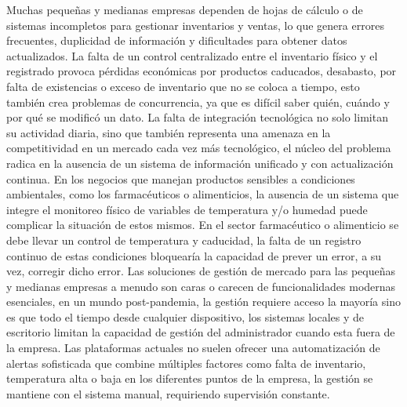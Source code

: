 

Muchas pequeñas y medianas empresas dependen de hojas de cálculo o de sistemas incompletos para gestionar inventarios y ventas, lo que genera errores frecuentes, duplicidad de información y dificultades para obtener datos actualizados. 
La falta de un control centralizado entre el inventario físico y el registrado provoca pérdidas económicas por productos caducados, desabasto, por falta de existencias o exceso de inventario que no se coloca a tiempo, esto también crea problemas de concurrencia, ya que es difícil saber quién, cuándo y por qué se modificó un dato. La falta de integración tecnológica no solo limitan su actividad diaria, sino que también representa una amenaza en la competitividad en un mercado cada vez más tecnológico, el núcleo del problema radica en la ausencia de un sistema de información unificado y con actualización continua.
En los negocios que manejan productos sensibles a condiciones ambientales, como los farmacéuticos o alimenticios, la ausencia de un sistema que integre el monitoreo físico de variables de temperatura y/o humedad puede complicar la situación de estos mismos. En el sector farmacéutico o alimenticio se debe llevar un control de temperatura y caducidad, la falta de un registro continuo de estas condiciones bloquearía la capacidad de prever un error, a su vez, corregir dicho error.
Las soluciones de gestión de mercado para las pequeñas y medianas empresas a menudo son caras o carecen de funcionalidades modernas esenciales, en un mundo post-pandemia, la gestión requiere acceso la mayoría sino es que todo el tiempo desde cualquier dispositivo, los sistemas locales y de escritorio limitan la capacidad de gestión del administrador cuando esta fuera de la empresa.
Las plataformas actuales no suelen ofrecer una automatización de alertas sofisticada que combine múltiples factores como falta de inventario, temperatura alta o baja en los diferentes puntos de la empresa, la gestión se mantiene con el sistema manual, requiriendo supervisión constante.
\thispagestyle{empty}
